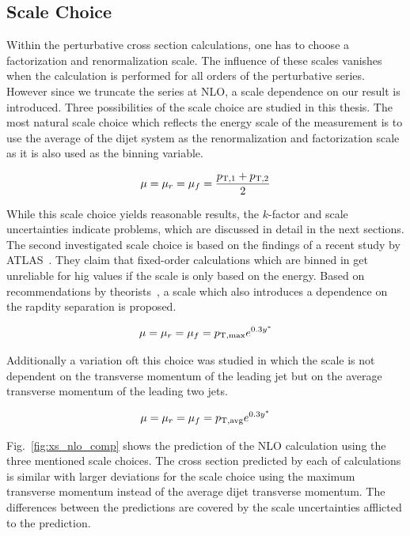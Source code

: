 \subsection{Scale Choice}

Within the perturbative cross section calculations, one has to choose a
factorization and renormalization scale. The influence of these scales vanishes
when the calculation is performed for all orders of the perturbative series.
However since we truncate the series at NLO, a scale dependence on our result is
introduced. Three possibilities of the scale choice are studied in this thesis.
The most natural scale choice which reflects the energy scale of the measurement
is to use the average \pt of the dijet system as the renormalization and
factorization scale as it is also used as the binning variable. 

\begin{equation*}
    \mu = \mu_r = \mu_f = \frac{p_{\mathrm{T},1} + p_{\mathrm{T},2}}{2}
\end{equation*}

While this scale choice yields reasonable results, the $k$-factor and scale
uncertainties indicate problems, which are discussed in detail
in the next sections. The second investigated scale choice is based on the
findings of a recent study by ATLAS~\cite{Aad:2011fc}. They claim that
fixed-order calculations which are binned in \ystar get unreliable for hig
\ystar values if the scale is only based on the energy. Based on recommendations
by theorists~\cite{Ellis:1992en}, a scale which also introduces a dependence on
the rapdity separation is proposed.

\begin{equation*}
    \mu = \mu_r = \mu_f = p_{\mathrm{T,max}} e^{0.3 y^*} 
\end{equation*}

Additionally a variation oft this choice was studied in which the scale is not
dependent on the transverse momentum of the leading jet but on the average
transverse momentum of the leading two jets.

\begin{equation*}
    \mu = \mu_r = \mu_f = p_{\mathrm{T,avg}} e^{0.3 y^*} 
\end{equation*}

Fig.~\ref{fig:xs_nlo_comp} shows the prediction of the NLO calculation using
the three mentioned scale choices. The cross section predicted by each of
calculations is similar with larger deviations for the scale choice using the
maximum transverse momentum instead of the average dijet transverse momentum.
The differences between the predictions are covered by the scale uncertainties
afflicted to the prediction.



